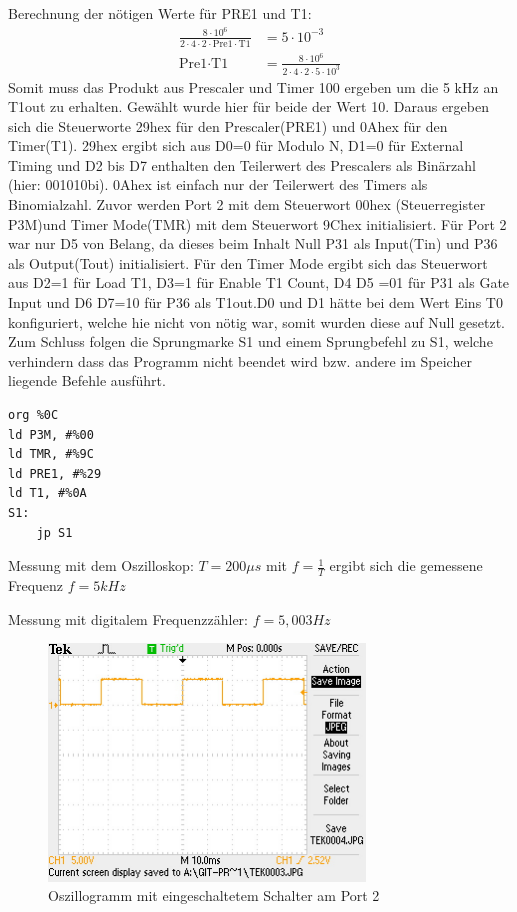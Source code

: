 Berechnung der nötigen Werte für PRE1 und T1:
\begin{align*}
\frac{8\cdot 10^6}{2\cdot4\cdot2\cdot\text{Pre1}\cdot\text{T1}}&=5\cdot10^{-3}\\
\text{Pre1}\cdot\text{T1}&= \frac{8\cdot10^6}{2\cdot4\cdot2\cdot5\cdot10^3}
\end{align*}
Somit muss das Produkt aus Prescaler und Timer 100 ergeben um die 5 kHz an T1out zu erhalten. Gewählt wurde hier für beide der Wert 10. Daraus ergeben sich die Steuerworte 29hex für den Prescaler(PRE1) und 0Ahex für den Timer(T1). 29hex ergibt sich aus D0=0 für Modulo N, D1=0 für External Timing und D2 bis D7 enthalten den Teilerwert des Prescalers als Binärzahl (hier: 001010bi). 0Ahex ist einfach nur der Teilerwert des Timers als Binomialzahl.
Zuvor werden Port 2 mit dem Steuerwort 00hex (Steuerregister P3M)und  Timer Mode(TMR) mit dem Steuerwort 9Chex initialisiert. Für Port 2 war nur D5 von Belang, da dieses  beim Inhalt  Null P31 als Input(Tin) und  P36 als Output(Tout) initialisiert. Für den Timer Mode ergibt sich das Steuerwort aus D2=1 für Load T1, D3=1 für Enable T1 Count, D4 D5 =01 für P31 als Gate Input und D6 D7=10 für P36 als T1out.D0 und D1 hätte bei dem Wert Eins T0 konfiguriert, welche hie nicht von nötig war, somit wurden diese auf Null gesetzt.
Zum Schluss folgen die Sprungmarke S1 und einem Sprungbefehl zu S1, welche verhindern dass das Programm nicht beendet wird bzw.  andere im Speicher liegende Befehle ausführt.

\begin{verbatim}
org %0C
ld P3M, #%00
ld TMR, #%9C
ld PRE1, #%29
ld T1, #%0A
S1:
	jp S1
\end{verbatim}
Messung mit dem Oszilloskop: $T= 200\mu s $ mit $f=\frac{1}{T}$ ergibt sich die gemessene Frequenz $f=5 kHz$

Messung mit digitalem Frequenzzähler: $f=5,003 Hz$


\begin{figure}[!ht]
\begin{center}
\includegraphics[width=0.75\textwidth]{os1} 
\caption{Oszillogramm mit eingeschaltetem Schalter am Port 2}
\label{os34a1}
\end{center}
\end{figure}


